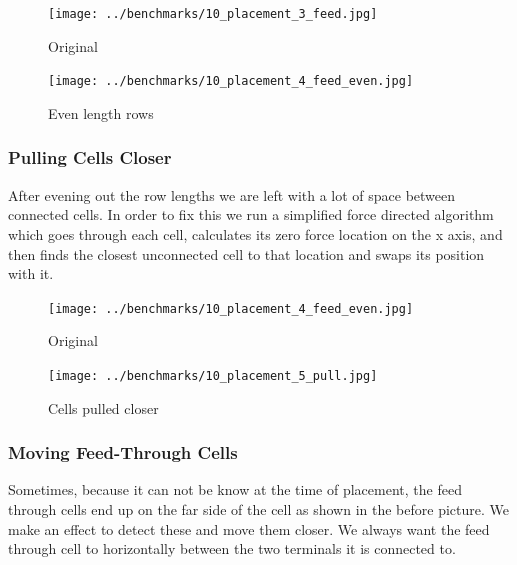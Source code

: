 \documentclass[10pt]{article}
\begin{document}
        \begin{figure}[H]
            \centering
            \texttt{[image: ../benchmarks/10\_placement\_3\_feed.jpg]}
            \caption{Original}
        \end{figure}
        \begin{figure}[H]
            \centering
            \texttt{[image: ../benchmarks/10\_placement\_4\_feed\_even.jpg]}
            \caption{Even length rows}
        \end{figure}

        \subsubsection{Pulling Cells Closer}

        After evening out the row lengths we are left with a lot of space
        between connected cells. In order to fix this we run a simplified force
        directed algorithm which goes through each cell, calculates its zero
        force location on the x axis, and then finds the closest unconnected
        cell to that location and swaps its position with it.

        \begin{figure}[H]
            \centering
            \texttt{[image: ../benchmarks/10\_placement\_4\_feed\_even.jpg]}
            \caption{Original}
        \end{figure}
        \begin{figure}[H]
            \centering
            \texttt{[image: ../benchmarks/10\_placement\_5\_pull.jpg]}
            \caption{Cells pulled closer}
        \end{figure}

        \newpage
        \subsubsection{Moving Feed-Through Cells}

        Sometimes, because it can not be know at the time of placement, the
        feed through cells end up on the far side of the cell as shown in the
        before picture. We make an effect to detect these and move them closer.
        We always want the feed through cell to horizontally between the two
        terminals it is connected to.
\end{document}
